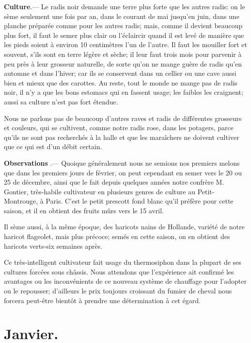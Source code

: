 \documentclass[10pt,a4paper]{book}
\begin{document}
\textbf{Culture}.--- Le radis noir demande une terre plus forte que les autres radis: on le sème seulement une fois par an, dans le courant de mai jusqu'en juin, dans une planche préparée comme pour les autres radis; mais, comme il devient beaucoup plus fort, il faut le semer plus clair ou l'éclaircir quand il est levé de manière que les pieds soient à environ 10 centimètres l'un de l'autre. Il faut les mouiller fort et souvent, s'ils sont en terre légère et sèche; il leur faut trois mois pour parvenir à peu près à leur grosseur naturelle, de sorte qu'on ne mange guère de radis qu'en automne et dans l'hiver; car ils se conservent dans un cellier ou une cave aussi bien et mieux que des carottes. Au reste, tout le monde ne mange pas de radis noir, il n'y a que les bons estomacs qui en fassent usage; les faibles les craignent; aussi sa culture n'est pas fort étendue.

Nous ne parlons pas de beaucoup d'autres raves et radis de différentes grosseurs et couleurs, qui se cultivent, comme notre radis rose, dans les potagers, parce qu'ils ne sont pas recherchés à la halle et que les maraîchers ne doivent cultiver que ce qui est d'un débit certain.

\begin{small}
\textbf{Observations}\label{radisnoirobservations} .--- Quoique généralement nous ne semions nos premiers melons que dans les premiers jours de février, on peut cependant en semer vers le 20 ou 25 de décembre, ainsi que le fait depuis quelques années notre confrère M. Gontier, très-habile cultivateur en plusieurs genres de culture au Petit-Montrouge, à Paris. C'est le petit prescott fond blanc qu'il préfère pour cette saison, et il en obtient des fruits mûrs vers le 15 avril.

Il sème aussi, à la même époque, des haricots nains de Hollande, variété de notre haricot flageolet, mais plus précoce; semés en cette saison, on en obtient des haricots verts-six semaines après.

Ce très-intelligent cultivateur fait usage du thermosiphon dans la plupart de ses cultures forcées sous châssis. Nous attendons que l'expérience ait confirmé les avantages ou les inconvénients de ce nouveau système de chauffage pour l'adopter ou le repousser; d'ailleurs le prix toujours croissant du fumier de cheval nous forcera peut-être bientôt à prendre une détermination à cet égard.
\end{small}

\section{Janvier.}
\end{document}
